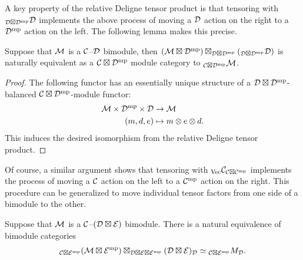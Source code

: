 \documentclass{amsart}
\begin{document}
A key property of the relative Deligne tensor product is that tensoring with ${}_{\mathcal D \boxtimes \mathcal D^{\mathrm{mp}}} \mathcal D$ implements the above process of moving a $\mathcal D$ action on the right to a $\mathcal D^{\mathrm{mp}}$ action on the left.  The following lemma makes this precise.

\begin{lemma} \label{lemma-actionswitch}
Suppose that $\mathcal M$ is a $\mathcal C$--$\mathcal D$ bimodule, then $(\mathcal M \boxtimes \mathcal D^{\mathrm{mp}}) \boxtimes_{\mathcal D \boxtimes \mathcal D^{\mathrm{mp}}} ({}_{\mathcal D \boxtimes \mathcal D^{\mathrm{mp}}} \mathcal D)$ is naturally equivalent as a $\mathcal C \boxtimes \mathcal D^{\mathrm{mp}}$ module category to ${}_{\mathcal C \boxtimes \mathcal D^{\mathrm{mp}}}\mathcal M$.
\end{lemma}
\begin{proof}
The following functor has an essentially unique structure of a $\mathcal D \boxtimes \mathcal D^{\mathrm{mp}}$-balanced $\mathcal C \boxtimes \mathcal D^{\mathrm{mp}}$-module functor:
\begin{align*}
	\mathcal M \times \mathcal D^{\mathrm{mp}} \times \mathcal D & \to \mathcal M \\
	(m, d, e) & \mapsto m \otimes e \otimes d.
\end{align*}
This induces the desired isomorphism from the relative Deligne tensor product. 
\end{proof} %

\nid Of course, a similar argument shows that tensoring with ${}_{\mathrm{Vec}} \mathcal C_{\mathcal C \boxtimes \mathcal C^{\mathrm{mp}}}$ implements the process of moving a $\mathcal C$ action on the left to a $\mathcal C^{\mathrm{mp}}$ action on the right. 
This procedure can be generalized to move individual tensor factors from one side of a bimodule to the other.

\begin{lemma} \label{lemma-actionpartialswitch}
Suppose that $\mathcal M$ is a $\mathcal C$--$(\mathcal D \boxtimes \mathcal E)$ bimodule.  There is a natural equivalence of bimodule categories
$${}_{\mathcal C \boxtimes \mathcal E^{\mathrm{mp}}} (\mathcal M \boxtimes \mathcal E^{\mathrm{mp}}) \boxtimes_{\mathcal D \boxtimes \mathcal E \boxtimes \mathcal E^{\mathrm{mp}}} (\mathcal D \boxtimes \mathcal E)_\mathcal D \simeq {}_{\mathcal C \boxtimes \mathcal E^{\mathrm{mp}}}M_\mathcal D.$$
\end{lemma}
\end{document}
